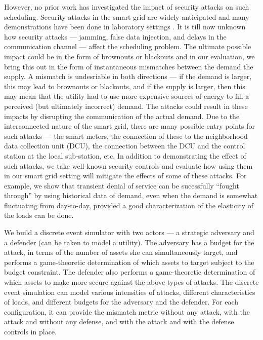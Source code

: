 \documentclass[conference]{IEEEtran}
\begin{document}
However, no prior work has investigated the impact of security attacks on such scheduling. Security attacks in the smart grid are widely anticipated \cite{nist} and many demonstrations have been done in laboratory settings \cite{hussain2012ncs}. It is till now unknown how security attacks --- jamming, false data injection, and delays in the communication channel --- affect the scheduling problem. The ultimate possible impact could be in the form of brownouts or blackouts and in our evaluation, we bring this out in the form of instantaneous mismatches between the demand the supply. A mismatch is undesriable in both directions --- if the demand is larger, this may lead to brownouts or blackouts, and if the supply is larger, then this may mean that the utility had to use more expensive sources of energy to fill a perceived (but ultimately incorrect) demand. The attacks could result in these impacts by disrupting the communication of the actual demand. Due to the interconnected nature of the smart grid, there are many possible entry points for such attacks --- the smart meters, the connection of these to the neighborhood data collection unit (DCU), the connection between the DCU and the control station at the local sub-station, etc. In addition to demonstrating the effect of such attacks, we take well-known security controls and evaluate how using them in our smart grid setting will mitigate the effects of some of these attacks. For example, we show that transient denial of service can be sucessfully ``fought through'' by using historical data of demand, even when the demand is somewhat fluctuating from day-to-day, provided a good characterization of the elasticity of the loads can be done. 

We build a discrete event simulator with two actors --- a strategic adversary and a defender (can be taken to model a utility). The adversary has a budget for the attack, in terms of the number of assets she can simultaneously target, and performs a game-theoretic determination of which assets to target subject to the budget constraint. The defender also performs a game-theoretic determination of which assets to make more secure against the above types of attacks. The discrete event simulation can model various intensities of attacks, different characteristics of loads, and different budgets for the adversary and the defender. For each configuration, it can provide the mismatch metric without any attack, with the attack and without any defense, and with the attack and with the defense controls in place. 
\end{document}
